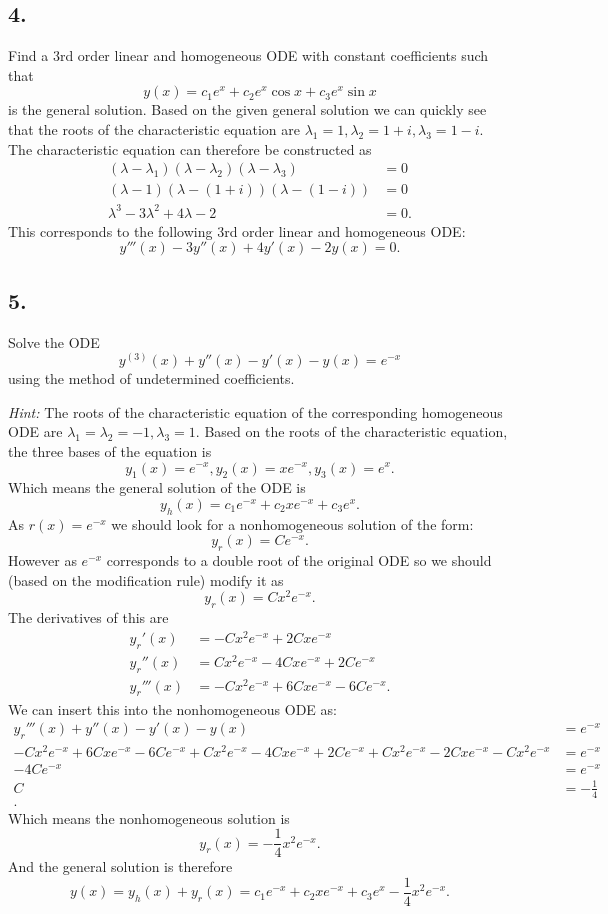 \subsection*{4.} Find a 3rd order linear and homogeneous ODE with constant coefficients such that
\[ 
y(x) = c_1 e^{x} + c_2 e^{x} \cos x + c_3 e^{x} \sin x
\]
is the general solution.
\bigbreak
Based on the given general solution we can quickly see that the roots of the characteristic equation are $\lambda_1 = 1, \lambda_2 = 1 + i, \lambda_3 = 1-i$. The characteristic equation can therefore be constructed as
\begin{align*}
  (\lambda - \lambda_1)(\lambda - \lambda_2)(\lambda - \lambda_3) &= 0 \\
  (\lambda-1)(\lambda - (1 + i))(\lambda - (1 - i)) &= 0 \\
  \lambda^3 - 3\lambda^2 + 4\lambda - 2 &= 0
.\end{align*}
This corresponds to the following 3rd order linear and homogeneous ODE:
\[ 
y'''(x) - 3y''(x) + 4y'(x) - 2y(x) = 0
.\]

\subsection*{5.} Solve the ODE
\[ 
y^{(3)}(x) + y''(x) - y'(x) - y(x) = e^{-x}
\]
using the method of undetermined coefficients.

\textit{Hint:} The roots of the characteristic equation of the corresponding homogeneous ODE are $\lambda_1 = \lambda_2 = -1, \lambda_3 = 1$.
\bigbreak
Based on the roots of the characteristic equation, the three bases of the equation is
\[ 
y_1(x) = e^{-x}, y_2(x) = x e^{-x}, y_3(x) = e^{x}
.\]
Which means the general solution of the ODE is
\[ 
y_h(x) =c_1 e^{-x} + c_2 x e^{-x} + c_3 e^{x}
.\]
As $r(x) = e^{-x}$ we should look for a nonhomogeneous solution of the form:
\[ 
y_r(x) = C e^{-x}
.\]
However as $e^{-x}$ corresponds to a double root of the original ODE so we should (based on the modification rule) modify it as
\[ 
y_r(x) = C x^2 e^{-x}
.\]
The derivatives of this are
\begin{align*}
  y_r'(x) &= - C x^2 e^{-x} + 2 Cx e^{-x} \\
  y_r''(x) &= C x^2 e^{-x} - 4 C x e^{-x} + 2C e^{-x} \\
  y_r'''(x) &= - C x^2 e^{-x} + 6 C x e^{-x} - 6 C e^{-x}
.\end{align*}
We can insert this into the nonhomogeneous ODE as:
\begin{align*}
  y_r'''(x) + y''(x) - y'(x) - y(x) &= e^{-x} \\
  - C x^2 e^{-x} + 6 Cx e^{-x} - 6 C e^{-x} + C x^2 e^{-x} - 4 C x e^{-x} + 2 C e^{-x} + Cx^2 e^{-x} - 2Cx e^{-x} - C x^2 e^{-x} &= e^{-x} \\
  - 4 C e^{-x} &= e^{-x}\\
  C &= - \frac{1}{4} \\
.\end{align*}
Which means the nonhomogeneous solution is
\[ 
y_r(x) = - \frac{1}{4} x^2 e^{-x}
.\]
And the general solution is therefore
\[ 
y(x) = y_h(x) + y_r(x) = c_1 e^{-x} + c_2 x e^{-x} + c_3 e^{x} - \frac{1}{4} x^2 e^{-x}
.\]


